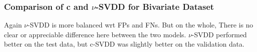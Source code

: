 \documentclass{article}
\begin{document}
\subsubsection{Comparison of c and $\nu$-SVDD for Bivariate Dataset}
Again $\nu$-SVDD is more balanced wrt FPs and FNs. But on the whole, There is no clear or appreciable difference here between the two models. $\nu$-SVDD performed better on the test data, but c-SVDD was slightly better on the validation data. 
\end{document}
